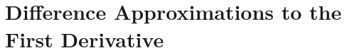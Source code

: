 % 
%
%
%
%
%
%
%
%
%
%
%
%
%

\section{Difference Approximations to the First Derivative}
\label{lab1:sec:diff-first-deriv}

